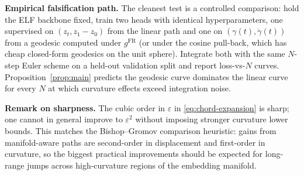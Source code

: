 \documentclass[11pt]{article}
\begin{document}
\medskip
\noindent\textbf{Empirical falsification path.}
The cleanest test is a controlled comparison: hold the ELF backbone
fixed, train two heads with identical hyperparameters, one supervised
on $(z_t, z_1 - z_0)$ from the linear path and one on
$(\gamma(t), \dot\gamma(t))$ from a geodesic computed under
$g^{\mathrm{FR}}$ (or under the cosine pull-back, which has cheap
closed-form geodesics on the unit sphere). Integrate both with the
same $N$-step Euler scheme on a held-out validation split and report
loss-vs-$N$ curves. Proposition~\ref{prop:main} predicts the geodesic
curve dominates the linear curve for every $N$ at which curvature
effects exceed integration noise.

\medskip
\noindent\textbf{Remark on sharpness.}
The cubic order in $\varepsilon$ in \eqref{eq:chord-expansion} is
sharp; one cannot in general improve to $\varepsilon^2$ without
imposing stronger curvature lower bounds. This matches the
Bishop--Gromov comparison heuristic: gains from manifold-aware paths
are second-order in displacement and first-order in curvature, so the
biggest practical improvements should be expected for long-range jumps
across high-curvature regions of the embedding manifold.
\end{document}
